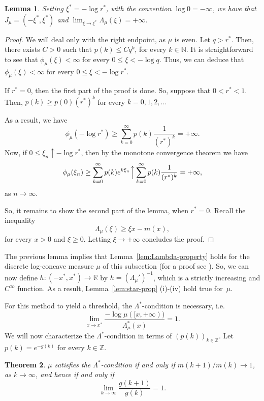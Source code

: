 \documentclass[11pt,a4paper]{article} %
\newtheorem{theorem}{Theorem}[section]
\newtheorem{lemma}[theorem]{Lemma}
\theoremstyle{definition}
\theoremstyle{remark}
\newcommand{\1}{\mathds{1}}
\begin{document}
\begin{lemma}\label{lem:mgf-conv}
Setting $\xi^\ast=-\log r^\ast$, with the convention $\log 0=-\infty$,  we have that $J_\mu=(-\xi^\ast,\xi^\ast)$ and $\lim_{\xi \to \xi^\ast} \Lambda_\mu(\xi)=+\infty$.
\end{lemma}


\begin{proof}
    We will deal only with the right endpoint, as $\mu$ is even. Let $q>r^\ast$. Then, there exists $C>0$ such that $p(k) \leq C q^k$, for every $k \in \mathbb{N}$. It is straightforward to see that $\phi_\mu(\xi) < \infty$ for every $0 \leq \xi <-\log q$. Thus, we can deduce that $\phi_\mu(\xi) < \infty$ for every $0 \leq \xi < -\log r^\ast$.

     If $r^\ast=0$, then the first part of the proof is done. So, suppose that $0<r^\ast<1$. Then, $p(k) \geq p(0)(r^{\ast})^k$ for every $k=0,1,2,\ldots$
     
       As a result, we have 
$$\phi_\mu(-\log r^\ast) \geq \sum\limits_{k=0}^{\infty} p(k) \frac{1}{(r^\ast)^k}=+\infty.$$ Now, if $0 \leq \xi_n \uparrow -\log r^\ast$, then by the monotone convergence theorem we have $$\phi_\mu(\xi_n) \geq \sum\limits_{k=0}^{\infty} p(k) e^{k \xi_n} \Big\uparrow \sum\limits_{k=0}^{\infty} p(k) \frac{1}{(r^\ast)^k}=+\infty,$$ as $n \to \infty$.

         So, it remains to show the second part of the lemma, when $r^\ast=0$. Recall the inequality $$\Lambda_\mu(\xi) \geq \xi x -m(x),$$ for every $x>0$ and $\xi \geq 0$. Letting $\xi \to +\infty$ concludes the proof. 
\end{proof}

The previous lemma implies that Lemma~\ref{lem:Lambda-property} holds for the discrete log-concave measure $\mu$ of this subsection (for a proof see \cite[Lemma 2.3 {\rm (ii)} and {\rm (iii)}]{Paf}). So, we can now define $h:(-x^\ast,x^\ast) \to \mathbb{R}$ by $h=(\Lambda_{\mu}')^{-1}$, which is a strictly increasing and $C^{\infty}$ function. As a result, Lemma~\ref{lem:star-prop} {\rm (i)}-{\rm (iv)} hold true for~$\mu$.

For this method to yield a threshold, the $\Lambda^\ast$-condition is necessary, i.e. $$\lim_{x \to x^\ast } \frac{-\log\mu([x,+\infty))}{\Lambda_{\mu}^\ast (x)}=1.$$ We will now characterize the $\Lambda^\ast$-condition in terms of $(p(k))_{k \in \mathbb{Z}}$. Let $p(k)=e^{-g(k)}$ for every $k \in \mathbb{Z}$.

\begin{theorem}\label{thm:Lambda-star-condition}
    $\mu$ satisfies the $\Lambda^\ast$-condition if and only if $m(k+1)/m(k) \to 1$, as $k \to \infty $, and hence if and only if $$\lim_{k \to \infty}\frac{g(k+1)}{g(k)}=1.$$
\end{theorem}
\end{document}
